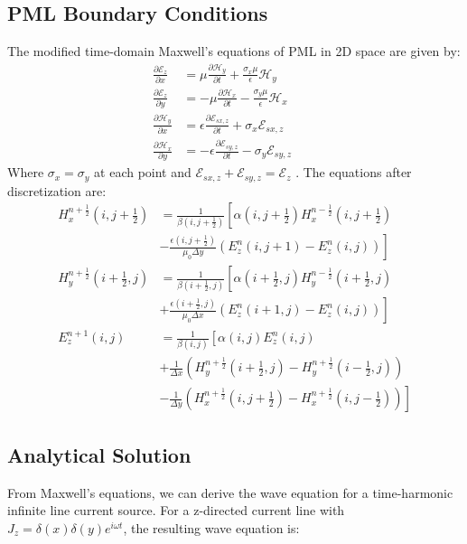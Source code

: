 \documentclass[journal]{IEEEtran}
\begin{document}
\subsection{PML Boundary Conditions}
The modified time-domain Maxwell’s equations of PML in 2D space are given by:
\begin{align}
\frac{\partial \mathcal{E}_z}{\partial x} &= \mu \frac{\partial \mathcal{H}_y}{\partial t} + \frac{\sigma_x \mu}{\epsilon} \mathcal{H}_y \qquad  \\
\frac{\partial \mathcal{E}_z}{\partial y} &= -\mu \frac{\partial \mathcal{H}_x}{\partial t} - \frac{\sigma_y \mu}{\epsilon} \mathcal{H}_x \qquad \\
\frac{\partial \mathcal{H}_y}{\partial x} &= \epsilon \frac{\partial \mathcal{E}_{sx,z}}{\partial t} + \sigma_x \mathcal{E}_{sx,z} \qquad  \\
\frac{\partial \mathcal{H}_x}{\partial y} &= -\epsilon \frac{\partial \mathcal{E}_{sy,z}}{\partial t} - \sigma_y \mathcal{E}_{sy,z} \qquad 
\end{align}
Where $\sigma_x=\sigma_y$ at each point and $\mathcal{E}_{sx,z}+\mathcal{E}_{sy,z}=\mathcal{E}_{z} $ .
The equations after discretization are:
\begin{align}
H_x^{n+\frac{1}{2}}(i,j+\frac{1}{2}) &= \frac{1}{\beta(i,j+\frac{1}{2})}\left[\alpha(i,j+\frac{1}{2}) H_x^{n-\frac{1}{2}}(i,j+\frac{1}{2}) \right. \nonumber \\
&\left. - \frac{\epsilon(i,j+\frac{1}{2})}{\mu_0 \Delta y}\left(E_z^n(i,j+1) - E_z^n(i,j)\right)\right] \\
H_y^{n+\frac{1}{2}}(i+\frac{1}{2},j) &= \frac{1}{\beta(i+\frac{1}{2},j)}\left[\alpha(i+\frac{1}{2},j) H_y^{n-\frac{1}{2}}(i+\frac{1}{2},j) \right. \nonumber \\
&\left. + \frac{\epsilon(i+\frac{1}{2},j)}{\mu_0 \Delta x}\left(E_z^n(i+1,j) - E_z^n(i,j)\right)\right] \\
E_z^{n+1}(i,j) &= \frac{1}{\beta(i,j)}\left[\alpha(i,j) E_z^n(i,j) \right. \nonumber \\
&\left. + \frac{1}{\Delta x}\left(H_y^{n+\frac{1}{2}}(i+\frac{1}{2},j) - H_y^{n+\frac{1}{2}}(i-\frac{1}{2},j)\right) \right. \nonumber \\
&\left. - \frac{1}{\Delta y}\left(H_x^{n+\frac{1}{2}}(i,j+\frac{1}{2}) - H_x^{n+\frac{1}{2}}(i,j-\frac{1}{2})\right)\right]
\end{align}

\subsection{Analytical Solution}
From Maxwell's equations, we can derive the wave equation for a time-harmonic infinite line current source. For a z-directed current line with $J_z = \delta(x)\delta(y)e^{i\omega t}$, the resulting wave equation is:
\end{document}
